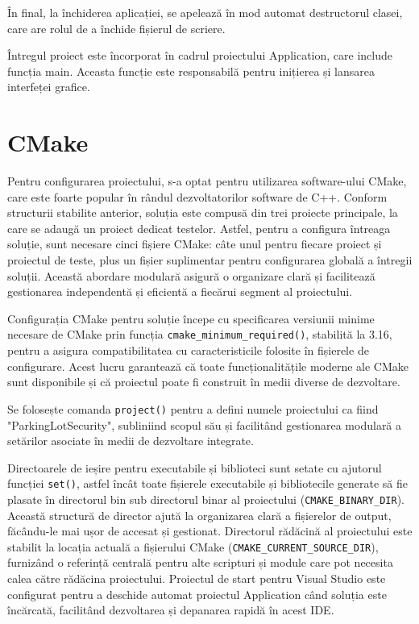 \documentclass[a4paper,12pt]{report}
\begin{document}
În final, la închiderea aplicației, se apelează în mod automat destructorul clasei, care are rolul de a închide fișierul de scriere.

Întregul proiect este încorporat în cadrul proiectului Application, care include funcția main. Aceasta funcție este responsabilă pentru inițierea și lansarea interfeței grafice.

\section{CMake}
Pentru configurarea proiectului, s-a optat pentru utilizarea software-ului CMake, care este foarte popular în rândul dezvoltatorilor software de C++. Conform structurii stabilite anterior, soluția este compusă din trei proiecte principale, la care se adaugă un proiect dedicat testelor. Astfel, pentru a configura întreaga soluție, sunt necesare cinci fișiere CMake: câte unul pentru fiecare proiect și proiectul de teste, plus un fișier suplimentar pentru configurarea globală a întregii soluții. Această abordare modulară asigură o organizare clară și facilitează gestionarea independentă și eficientă a fiecărui segment al proiectului.

Configurația CMake pentru soluție începe cu specificarea versiunii minime necesare de CMake prin funcția \texttt{cmake\_minimum\_required()}, stabilită la 3.16, pentru a asigura compatibilitatea cu caracteristicile folosite în fișierele de configurare. Acest lucru garantează că toate funcționalitățile moderne ale CMake sunt disponibile și că proiectul poate fi construit în medii diverse de dezvoltare.

Se folosește comanda \texttt{project()} pentru a defini numele proiectului ca fiind "ParkingLotSecurity", subliniind scopul său și facilitând gestionarea modulară a setărilor asociate în medii de dezvoltare integrate.

Directoarele de ieșire pentru executabile și biblioteci sunt setate cu ajutorul funcției \texttt{set()}, astfel încât toate fișierele executabile și bibliotecile generate să fie plasate în directorul bin sub directorul binar al proiectului (\texttt{CMAKE\_BINARY\_DIR}). Această structură de director ajută la organizarea clară a fișierelor de output, făcându-le mai ușor de accesat și gestionat. Directorul rădăcină al proiectului este stabilit la locația actuală a fișierului CMake (\texttt{CMAKE\_CURRENT\_SOURCE\_DIR}), furnizând o referință centrală pentru alte scripturi și module care pot necesita calea către rădăcina proiectului. Proiectul de start pentru Visual Studio este configurat pentru a deschide automat proiectul Application când soluția este încărcată, facilitând dezvoltarea și depanarea rapidă în acest IDE.
\end{document}
